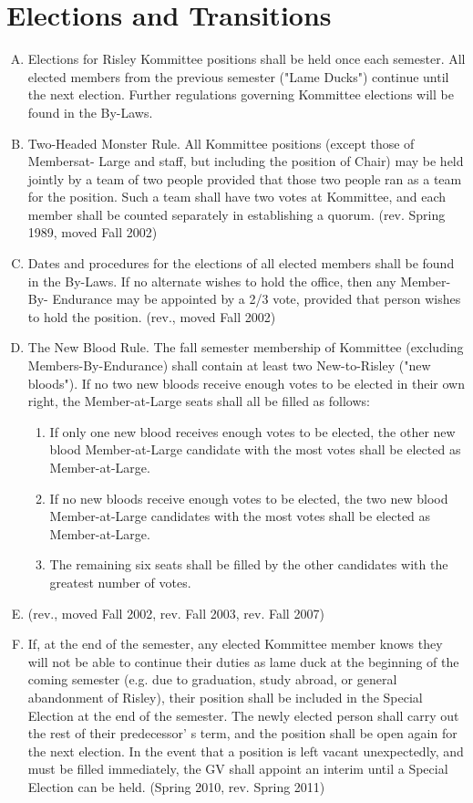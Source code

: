 \documentclass[12pt]{article}
\begin{document}
\section{Elections and Transitions}
\begin{enumerate}[A.]
\item Elections for Risley Kommittee positions shall be held once each semester. All elected members from the previous semester ("Lame Ducks") continue until the next election. Further regulations governing Kommittee elections will be found in the By-Laws.
\item Two-Headed Monster Rule. All Kommittee positions (except those of Membersat- Large and staff, but including the position of Chair) may be held jointly by a team of two people provided that those two people ran as a team for the position. Such a team shall have two votes at Kommittee, and each member shall be counted separately in establishing a quorum. (rev. Spring 1989, moved Fall 2002)
\item Dates and procedures for the elections of all elected members shall be found in the By-Laws. If no alternate wishes to hold the office, then any Member-By- Endurance may be appointed by a 2/3 vote, provided that person wishes to hold the position. (rev., moved Fall 2002)
\item The New Blood Rule. The fall semester membership of Kommittee (excluding Members-By-Endurance) shall contain at least two New-to-Risley ("new bloods"). If no two new bloods receive enough votes to be elected in their own right, the Member-at-Large seats shall all be filled as follows:
\begin{enumerate}[1.]
\item If only one new blood receives enough votes to be elected, the other new blood Member-at-Large candidate with the most votes shall be elected as Member-at-Large.
\item If no new bloods receive enough votes to be elected, the two new blood Member-at-Large candidates with the most votes shall be elected as Member-at-Large.
\item The remaining six seats shall be filled by the other candidates with the greatest number of votes.
\end{enumerate}
\item (rev., moved Fall 2002, rev. Fall 2003, rev. Fall 2007)
\item If, at the end of the semester, any elected Kommittee member knows they will not be able to continue their duties as lame duck at the beginning of the coming semester (e.g. due to graduation, study abroad, or general abandonment of Risley), their position shall be included in the Special Election at the end of the semester. The newly elected person shall carry out the rest of their predecessor’ s term, and the position shall be open again for the next election. In the event that a position is left vacant unexpectedly, and must be filled immediately, the GV shall appoint an interim until a Special Election can be held. (Spring 2010, rev. Spring 2011)
\end{enumerate}
\end{document}
